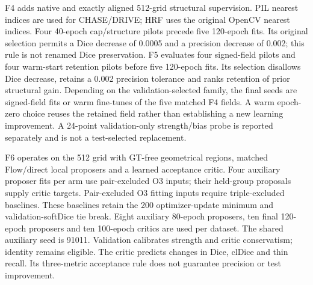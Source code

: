 \documentclass[jimaging,article,submit,pdftex,moreauthors]{Definitions/mdpi}
\begin{document}
F4 adds native and exactly aligned 512-grid structural supervision. PIL nearest
indices are used for CHASE/DRIVE; HRF uses the original OpenCV nearest indices.
Four 40-epoch cap/structure pilots precede five 120-epoch fits. Its original
selection permits a Dice decrease of 0.0005 and a precision decrease of 0.002;
this rule is not renamed Dice preservation. F5 evaluates four signed-field
pilots and four warm-start retention pilots before five 120-epoch fits. Its
selection disallows Dice decrease, retains a 0.002 precision tolerance and ranks
retention of prior structural gain. Depending on the validation-selected family,
the final seeds are signed-field fits or warm fine-tunes of the five matched
F4 fields. A warm epoch-zero choice reuses the retained field rather than
establishing a new learning improvement. A 24-point validation-only strength/bias
probe is reported separately and is not a test-selected replacement.

F6 operates on the 512 grid with GT-free geometrical regions, matched Flow/direct
local proposers and a learned acceptance critic. Four auxiliary proposer fits
per arm use pair-excluded O3 inputs; their held-group proposals supply critic
targets. Pair-excluded O3 fitting inputs require triple-excluded baselines.
These baselines retain the 200 optimizer-update minimum and validation-softDice
tie break. Eight auxiliary 80-epoch proposers, ten final 120-epoch proposers and
ten 100-epoch critics are used per dataset. The shared auxiliary seed is 91011.
Validation calibrates strength and critic conservatism; identity remains
eligible. The critic predicts changes in Dice, clDice and thin recall. Its
three-metric acceptance rule does not guarantee precision or test improvement.
\end{document}

